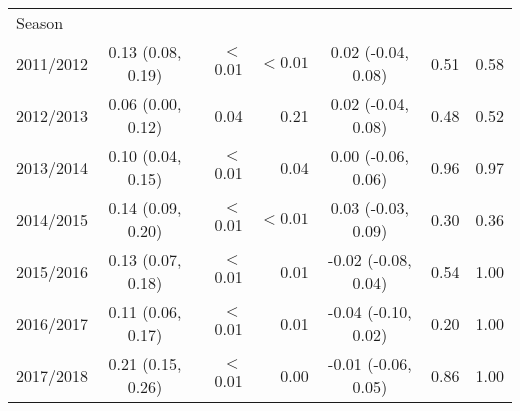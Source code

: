 \documentclass[sagev,times,Review,10pt]{sagej}
\begin{document}
\begin{appendix}
\begin{table}[ht!]
\begin{tabular}{lcrrcrr}
  Season\\
 \hspace{3mm} 2011/2012 & 0.13 (0.08, 0.19) & $<$0.01  &$<0.01$& 0.02 (-0.04, 0.08) &0.51&0.58\\
 \hspace{3mm} 2012/2013	& 0.06 (0.00, 0.12) &0.04&0.21& 0.02 (-0.04, 0.08) &0.48&0.52\\
 \hspace{3mm} 2013/2014	& 0.10 (0.04, 0.15) & $<$0.01  &0.04& 0.00 (-0.06, 0.06) &0.96&0.97\\
 \hspace{3mm} 2014/2015	& 0.14 (0.09, 0.20) & $<$0.01  &$<0.01$& 0.03 (-0.03, 0.09) &0.30&0.36\\
 \hspace{3mm} 2015/2016	& 0.13 (0.07, 0.18) & $<$0.01  &0.01& -0.02 (-0.08, 0.04) &0.54&1.00\\
 \hspace{3mm} 2016/2017	& 0.11 (0.06, 0.17) & $<$0.01  &0.01& -0.04 (-0.10, 0.02) &0.20&1.00\\
 \hspace{3mm} 2017/2018	& 0.21 (0.15, 0.26) & $<$0.01  &0.00& -0.01 (-0.06, 0.05) &0.86&1.00\\ 


\end{tabular}
\end{table}
\end{appendix}
\end{document}
